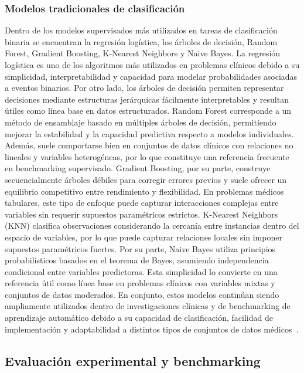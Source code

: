 \subsubsection{Modelos tradicionales de clasificación}

Dentro de los modelos supervisados más utilizados en tareas de clasificación binaria se encuentran la regresión logística, los árboles de decisión, Random Forest, Gradient Boosting, K-Nearest Neighbors y Naive Bayes.
La regresión logística es uno de los algoritmos más utilizados en problemas clínicos debido a su simplicidad, interpretabilidad y capacidad para modelar probabilidades asociadas a eventos binarios. Por otro lado, los árboles de decisión permiten representar decisiones mediante estructuras jerárquicas fácilmente interpretables y resultan útiles como línea base en datos estructurados.
Random Forest corresponde a un método de ensamblaje basado en múltiples árboles de decisión, permitiendo mejorar la estabilidad y la capacidad predictiva respecto a modelos individuales. Además, suele comportarse bien en conjuntos de datos clínicos con relaciones no lineales y variables heterogéneas, por lo que constituye una referencia frecuente en benchmarking supervisado.
Gradient Boosting, por su parte, construye secuencialmente árboles débiles para corregir errores previos y suele ofrecer un equilibrio competitivo entre rendimiento y flexibilidad. En problemas médicos tabulares, este tipo de enfoque puede capturar interacciones complejas entre variables sin requerir supuestos paramétricos estrictos.
K-Nearest Neighbors (KNN) clasifica observaciones considerando la cercanía entre instancias dentro del espacio de variables, por lo que puede capturar relaciones locales sin imponer supuestos paramétricos fuertes. Por su parte, Naive Bayes utiliza principios probabilísticos basados en el teorema de Bayes, asumiendo independencia condicional entre variables predictoras. Esta simplicidad lo convierte en una referencia útil como línea base en problemas clínicos con variables mixtas y conjuntos de datos moderados.
En conjunto, estos modelos continúan siendo ampliamente utilizados dentro de investigaciones clínicas y de benchmarking de aprendizaje automático debido a su capacidad de clasificación, facilidad de implementación y adaptabilidad a distintos tipos de conjuntos de datos médicos~\citep{james2021}.

\subsection{Evaluación experimental y benchmarking}

